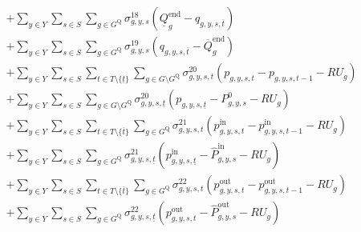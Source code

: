 \documentclass{article}
\newcommand{\sGenerators}{G}
\newcommand{\sStorage}{G^{\mathrm{Q}}}
\newcommand{\sYears}{Y}
\newcommand{\sScenarios}{S}
\newcommand{\sIntervals}{T}
\newcommand{\iGenerator}{g}
\newcommand{\iYear}{y}
\newcommand{\iScenario}{s}
\newcommand{\iInterval}{t}
\newcommand{\iIntervalTerminal}{\overline{\iInterval}}
\newcommand{\iIntervalStart}{\underline{\iInterval}}
\newcommand{\cRampRateUp}[1][\iGenerator]{RU_{#1}}
\newcommand{\cStorageUnitEnergyIntervalEndMax}[1][\iGenerator]{\overline{Q}^{\mathrm{end}}_{#1}}
\newcommand{\cStorageUnitEnergyIntervalEndMin}[1][\iGenerator]{\underline{Q}^{\mathrm{end}}_{#1}}
\newcommand{\cPowerInitial}[1][\iGenerator,\iYear,\iScenario]{P_{#1}^{0}}
\newcommand{\cPowerOutInitial}[1][\iGenerator,\iYear,\iScenario]{\hat{P}_{#1}^{\mathrm{out}}}
\newcommand{\cPowerInInitial}[1][\iGenerator,\iYear,\iScenario]{\hat{P}_{#1}^{\mathrm{in}}}
\newcommand{\vPower}[1][\iGenerator,\iYear,\iScenario,\iInterval]{p_{#1}}
\newcommand{\vPowerIn}[1][\iGenerator,\iYear,\iScenario,\iInterval]{p^{\mathrm{in}}_{#1}}
\newcommand{\vPowerOut}[1][\iGenerator,\iYear,\iScenario,\iInterval]{p^{\mathrm{out}}_{#1}}
\newcommand{\vStorageUnitEnergy}[1][\iGenerator,\iYear,\iScenario,\iInterval]{q_{#1}}
\newcommand{\dMinStorageEnergyIntervalEnd}[1][\iGenerator,\iYear,\iScenario]{\sigma_{#1}^{18}}
\newcommand{\dMaxStorageEnergyIntervalEnd}[1][\iGenerator,\iYear,\iScenario]{\sigma_{#1}^{19}}
\newcommand{\dRampRateUp}[1][\iGenerator,\iYear,\iScenario,\iInterval]{\sigma_{#1}^{20}}
\newcommand{\dRampRateUpStorageCharging}[1][\iGenerator,\iYear,\iScenario,\iInterval]{\sigma_{#1}^{21}}
\newcommand{\dRampRateUpStorageDischarging}[1][\iGenerator,\iYear,\iScenario,\iInterval]{\sigma_{#1}^{22}}
\begin{document}
\begin{align}
		& + \sum\limits_{\iYear \in \sYears}\sum\limits_{\iScenario \in \sScenarios} \sum\limits_{\iGenerator \in \sStorage} \dMinStorageEnergyIntervalEnd \left(\cStorageUnitEnergyIntervalEndMin - \vStorageUnitEnergy[\iGenerator,\iYear,\iScenario,\iIntervalTerminal]\right)\\
		& + \sum\limits_{\iYear \in \sYears}\sum\limits_{\iScenario \in \sScenarios} \sum\limits_{\iGenerator \in \sStorage} \dMaxStorageEnergyIntervalEnd \left(\vStorageUnitEnergy[\iGenerator,\iYear,\iScenario,\iIntervalTerminal] - \cStorageUnitEnergyIntervalEndMax\right)\\
		& + \sum\limits_{\iYear \in \sYears}\sum\limits_{\iScenario \in \sScenarios}\sum\limits_{\iInterval \in \sIntervals \setminus \{\iIntervalStart\}} \sum\limits_{\iGenerator \in \sGenerators \setminus \sStorage} \dRampRateUp \left(\vPower - \vPower[\iGenerator,\iYear,\iScenario,\iInterval-1] - \cRampRateUp\right)\\
		& + \sum\limits_{\iYear \in \sYears}\sum\limits_{\iScenario \in \sScenarios} \sum\limits_{\iGenerator \in \sGenerators \setminus \sStorage} \dRampRateUp[\iGenerator,\iYear,\iScenario,\iIntervalStart] \left(\vPower[\iGenerator,\iYear,\iScenario,\iIntervalStart] - \cPowerInitial - \cRampRateUp\right)\\
		& +  \sum\limits_{\iYear \in \sYears}\sum\limits_{\iScenario \in \sScenarios} \sum\limits_{\iInterval \in \sIntervals \setminus \{\iIntervalTerminal\}} \sum\limits_{\iGenerator \in \sStorage} \dRampRateUpStorageCharging \left(\vPowerIn - \vPowerIn[\iGenerator,\iYear,\iScenario,\iInterval-1] - \cRampRateUp\right) \\
		& +  \sum\limits_{\iYear \in \sYears}\sum\limits_{\iScenario \in \sScenarios} \sum\limits_{\iGenerator \in \sStorage} \dRampRateUpStorageCharging[\iGenerator,\iYear,\iScenario,\iIntervalStart] \left(\vPowerIn[\iGenerator,\iYear,\iScenario,\iIntervalStart] - \cPowerInInitial - \cRampRateUp\right) \\
		& +  \sum\limits_{\iYear \in \sYears}\sum\limits_{\iScenario \in \sScenarios} \sum\limits_{\iInterval \in \sIntervals \setminus \{\iIntervalTerminal\}} \sum\limits_{\iGenerator \in \sStorage} \dRampRateUpStorageDischarging \left(\vPowerOut - \vPowerOut[\iGenerator,\iYear,\iScenario,\iInterval-1] - \cRampRateUp\right) \\
		& +  \sum\limits_{\iYear \in \sYears}\sum\limits_{\iScenario \in \sScenarios} \sum\limits_{\iGenerator \in \sStorage} \dRampRateUpStorageDischarging[\iGenerator,\iYear,\iScenario,\iIntervalStart] \left(\vPowerOut - \cPowerOutInitial - \cRampRateUp\right) \\

\end{align}
\end{document}
